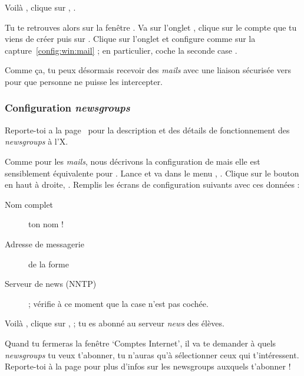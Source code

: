 Voil\`a , clique sur , .

Tu te retrouves alors sur la fen\^etre . Va sur
l'onglet , clique sur le compte que tu viens de cr\'eer
puis sur . Clique sur l'onglet  et
configure comme sur la capture~\ref{config:win:mail} ; en
particulier, coche la seconde case .

Comme \c{c}a, tu peux d\'esormais recevoir des \emph{mails} avec une liaison
s\'ecuris\'ee vers  pour que personne ne puisse les
intercepter.



\subsubsection{Configuration \emph{newsgroups}}

Reporte-toi a la page~\pageref{newsgroups} pour la description et des d\'etails de fonctionnement des \emph{newsgroups} \`a  l'X.

Comme pour les \emph{mails}, nous d\'ecrivons la configuration de  mais elle est sensiblement \'equivalente pour . Lance
 et va dans le menu , . Clique sur le bouton  en haut \`a  droite,
. Remplis les \'ecrans de configuration suivants avec ces donn\'ees :
\begin{description}
  \item[Nom complet] ton nom !
  \item[Adresse de messagerie] de la forme 
  \item[Serveur de news (NNTP)]  ; v\'erifie \`a  ce moment que la case
        n'est pas coch\'ee.
\end{description}
Voil\`a , clique sur , ; tu es abonn\'e
au serveur \emph{news} des \'el\`eves.

Quand tu fermeras la fen\^etre `Comptes Internet', il va te demander \`a 
quels \emph{newsgroups} tu veux t'abonner, tu n'auras qu'\`a  s\'electionner
ceux qui t'int\'eressent. Reporte-toi \`a  la page \pageref{newsgroups}
pour plus d'infos sur les newsgroups auxquels t'abonner !


